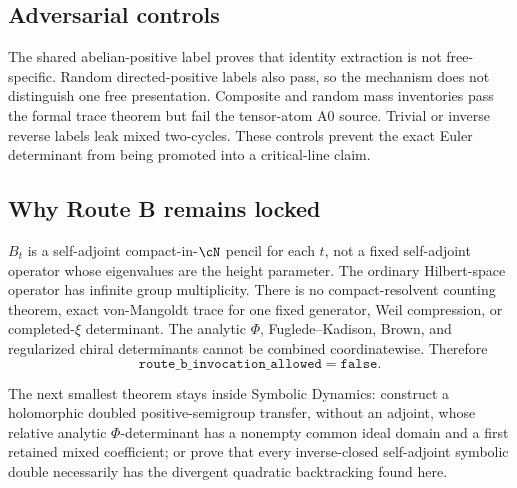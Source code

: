 \subsection{Adversarial controls}

The shared abelian-positive label proves that identity extraction is not
free-specific.  Random directed-positive labels also pass, so the mechanism
does not distinguish one free presentation.  Composite and random mass
inventories pass the formal trace theorem but fail the tensor-atom A0 source.
Trivial or inverse reverse labels leak mixed two-cycles.  These controls
prevent the exact Euler determinant from being promoted into a critical-line
claim.

\subsection{Why Route B remains locked}

$B_t$ is a self-adjoint compact-in-$\cN$ pencil for each $t$, not a fixed
self-adjoint operator whose eigenvalues are the height parameter.  The
ordinary Hilbert-space operator has infinite group multiplicity.  There is
no compact-resolvent counting theorem, exact von-Mangoldt trace for one fixed
generator, Weil compression, or completed-$\xi$ determinant.  The analytic
$\Phi$, Fuglede--Kadison, Brown, and regularized chiral determinants cannot be
combined coordinatewise.  Therefore
\[
 \mathtt{route\_b\_invocation\_allowed=false}.
\]

The next smallest theorem stays inside Symbolic Dynamics: construct a
holomorphic doubled positive-semigroup transfer, without an adjoint, whose
relative analytic $\Phi$-determinant has a nonempty common ideal domain and a
first retained mixed coefficient; or prove that every inverse-closed
self-adjoint symbolic double necessarily has the divergent quadratic
backtracking found here.
